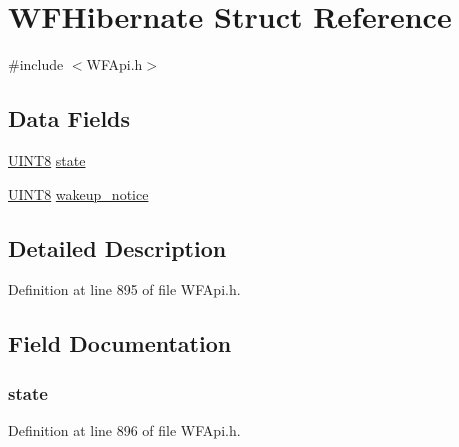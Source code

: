 \hypertarget{struct_w_f_hibernate}{}\section{W\+F\+Hibernate Struct Reference}
\label{struct_w_f_hibernate}


{\ttfamily \#include $<$W\+F\+Api.\+h$>$}

\subsection*{Data Fields}
\begin{DoxyCompactItemize}
\item 
\hyperlink{_generic_type_defs_8h_ab27e9918b538ce9d8ca692479b375b6a}{U\+I\+N\+T8} \hyperlink{struct_w_f_hibernate_a6e9c4cbd32a1178b12f3a61f6855c896}{state}
\item 
\hyperlink{_generic_type_defs_8h_ab27e9918b538ce9d8ca692479b375b6a}{U\+I\+N\+T8} \hyperlink{struct_w_f_hibernate_af05425a7593f60edaa1ec4e95d77628a}{wakeup\+\_\+notice}
\end{DoxyCompactItemize}


\subsection{Detailed Description}


Definition at line 895 of file W\+F\+Api.\+h.



\subsection{Field Documentation}
\hypertarget{struct_w_f_hibernate_a6e9c4cbd32a1178b12f3a61f6855c896}{}
\subsubsection[{state}]{ state}\label{struct_w_f_hibernate_a6e9c4cbd32a1178b12f3a61f6855c896}


Definition at line 896 of file W\+F\+Api.\+h.

\hypertarget{struct_w_f_hibernate_af05425a7593f60edaa1ec4e95d77628a}{}
